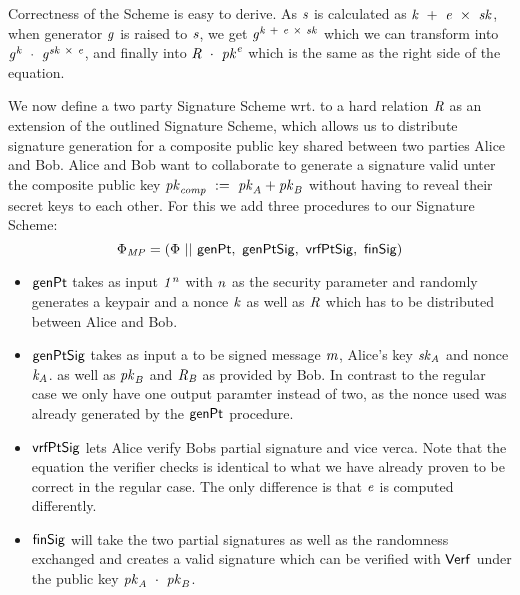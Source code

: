 Correctness of the Scheme is easy to derive. As $\mathit{s}$ is calculated as $\mathit{k} ~+~ \mathit{e} ~\times~ \mathit{sk}$, when generator $\mathit{g}$ is raised to $\mathit{s}$, we get
$\mathit{g}^{\mathit{k} ~+~ \mathit{e} ~\times~ \mathit{sk}}$ which we can transform into $\mathit{g}^{\mathit{k}} ~\cdot~ \mathit{g}^{\mathit{sk} ~\times~ \mathit{e}}$, and finally
into $\mathit{R} ~\cdot~ \mathit{pk}^{\mathit{e}}$ which is the same as the right side of the equation.

\begin{definition}
    \label{def:twoPartySig}
    We now define a two party Signature Scheme wrt. to a hard relation $\mathit{R}$ as an extension of the outlined Signature Scheme,
    which allows us to distribute signature generation for a composite public key shared between two parties Alice and Bob. Alice and Bob want to collaborate to generate a signature valid unter the composite
    public key $\mathit{pk}_{\mathit{comp}} ~:=~ \mathit{pk}_{\mathit{A}} + \mathit{pk}_{\mathit{B}}$ without having to reveal their secret keys to each other. For this we add three procedures to our Signature Scheme:
    \[ \Phi_{\mathit{MP}} = (\Phi ~||~ \mathsf{genPt} ,~ \mathsf{genPtSig} ,~ \mathsf{vrfPtSig} ,~ \mathsf{finSig}) \]
    \begin{itemize}
        \item $\mathsf{genPt}$ takes as input $\mathit{1^n}$ with $\mathit{n}$ as the security parameter and randomly generates a keypair and a nonce $\mathit{k}$ as well as $\mathit{R}$ which has to be
        distributed between Alice and Bob.
        \item $\mathsf{genPtSig}$ takes as input a to be signed message $\mathit{m}$, Alice's key $\mathit{sk}_{\mathit{A}}$ and nonce $\mathit{\mathit{k}_{\mathit{A}}}$. as well as $\mathit{pk}_{\mathit{B}}$ and $\mathit{R}_{\mathit{B}}$ as provided
        by Bob. In contrast to the regular case we only have one output paramter instead of two, as the nonce used was already generated by the $\mathsf{genPt}$ procedure.
        \item $\mathsf{vrfPtSig}$ lets Alice verify Bobs partial signature and vice verca. Note that the equation the verifier checks is identical to what we have already proven to be correct in the regular
        case. The only difference is that $\mathit{e}$ is computed differently.
        \item $\mathsf{finSig}$ will take the two partial signatures as well as the randomness exchanged and creates a valid signature which can be verified with $\mathsf{Verf}$ under the public key
        $\mathit{pk}_{\mathit{A}} ~\cdot~ \mathit{pk}_{\mathit{B}}$.
    \end{itemize}
\end{definition}


